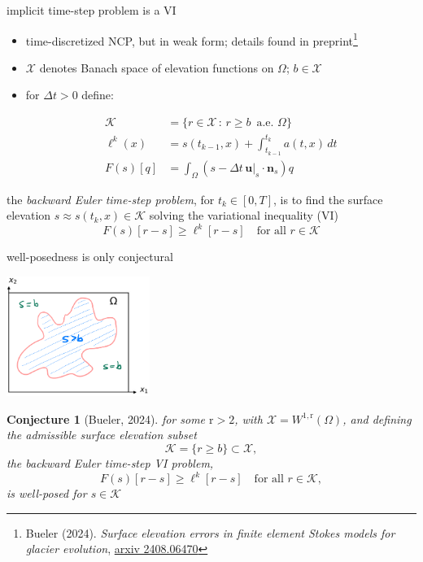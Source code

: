 \documentclass[10pt,dvipsnames]{beamer}
\theoremstyle{theorem}
\newtheorem*{conjecture}{Conjecture}
\newcommand{\bn}{\mathbf{n}}
\newcommand{\bu}{\mathbf{u}}
\newcommand{\cK}{\mathcal{K}}
\newcommand{\cX}{\mathcal{X}}
\newcommand{\rr}{\mathrm{r}}
\begin{document}
\begin{frame}{implicit time-step problem is a VI}

\begin{itemize}
\item time-discretized NCP, but in weak form; details found in preprint\footnote{Bueler (2024). \emph{Surface elevation errors in finite element Stokes models for glacier evolution}, \href{https://www.arxiv.org/abs/2408.06470}{arxiv 2408.06470}}
\item $\cX$ denotes Banach space of elevation functions on $\Omega$; $b\in\cX$
\item for $\Delta t > 0$ define:

\vspace{-7mm}
\begin{align*}
\cK &= \{r \in \cX\,:\, r \ge b \,\text{ a.e. } \Omega\} \\
\ell^k(x) &= s(t_{k-1},x) + \int_{t_{k-1}}^{t_k} a(t,x)\,dt \\
F(s)[q] &= \int_\Omega (s - \Delta t\,\bu|_s \cdot \bn_s) q 
\end{align*}
\end{itemize}

\medskip
\begin{definition}
the \emph{backward Euler time-step problem}, for $t_k \in [0,T]$, is to find the surface elevation $s \approx s(t_k,x) \in \cK$ solving the variational inequality (VI)
$$F(s)[r-s] \ge \ell^k[r-s] \quad \text{for all } r \in \cK$$
\end{definition}

\bigskip
\end{frame}


\begin{frame}{well-posedness is only conjectural}

\hfill \includegraphics[width=0.35\textwidth]{mapplane}

\begin{conjecture}[Bueler, 2024]
for some $\rr>2$, with $\cX = W^{1,\rr}(\Omega)$, and defining the admissible surface elevation subset
    $$\cK = \{r \ge b\} \subset \cX,$$
the backward Euler time-step VI problem,
    $$F(s)[r-s] \ge \ell^k[r-s] \quad \text{for all } r \in \cK,$$
is well-posed for $s\in\cK$
\end{conjecture}
\end{frame}
\end{document}
